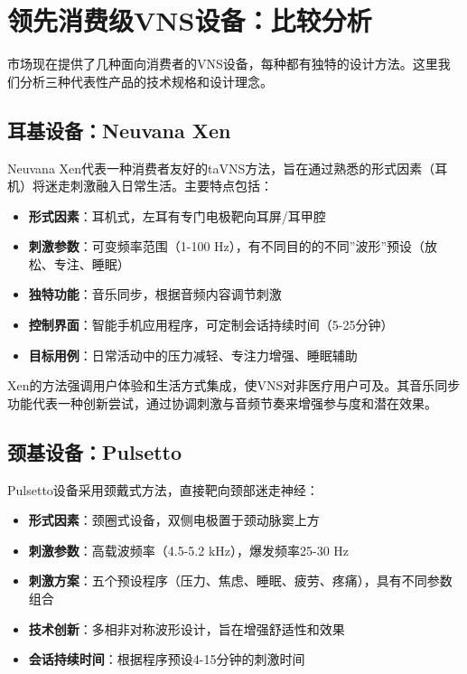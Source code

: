 \documentclass[
  Letterpaper,
]{scrbook}
\providecommand{\tightlist}{%
  \setlength{\itemsep}{0pt}\setlength{\parskip}{0pt}}\usepackage{longtable,booktabs,array}
\begin{document}
\section{领先消费级VNS设备：比较分析}\label{ux9886ux5148ux6d88ux8d39ux7ea7vnsux8bbeux5907ux6bd4ux8f83ux5206ux6790}

市场现在提供了几种面向消费者的VNS设备，每种都有独特的设计方法。这里我们分析三种代表性产品的技术规格和设计理念。

\subsection{耳基设备：Neuvana
Xen}\label{ux8033ux57faux8bbeux5907neuvana-xen}

Neuvana
Xen代表一种消费者友好的taVNS方法，旨在通过熟悉的形式因素（耳机）将迷走刺激融入日常生活。主要特点包括：

\begin{itemize}
\tightlist
\item
  \textbf{形式因素}：耳机式，左耳有专门电极靶向耳屏/耳甲腔
\item
  \textbf{刺激参数}：可变频率范围（1-100
  Hz），有不同目的的不同''波形''预设（放松、专注、睡眠）
\item
  \textbf{独特功能}：音乐同步，根据音频内容调节刺激
\item
  \textbf{控制界面}：智能手机应用程序，可定制会话持续时间（5-25分钟）
\item
  \textbf{目标用例}：日常活动中的压力减轻、专注力增强、睡眠辅助
\end{itemize}

Xen的方法强调用户体验和生活方式集成，使VNS对非医疗用户可及。其音乐同步功能代表一种创新尝试，通过协调刺激与音频节奏来增强参与度和潜在效果。

\subsection{颈基设备：Pulsetto}\label{ux9888ux57faux8bbeux5907pulsetto}

Pulsetto设备采用颈戴式方法，直接靶向颈部迷走神经：

\begin{itemize}
\tightlist
\item
  \textbf{形式因素}：颈圈式设备，双侧电极置于颈动脉窦上方
\item
  \textbf{刺激参数}：高载波频率（4.5-5.2 kHz），爆发频率25-30 Hz
\item
  \textbf{刺激方案}：五个预设程序（压力、焦虑、睡眠、疲劳、疼痛），具有不同参数组合
\item
  \textbf{技术创新}：多相非对称波形设计，旨在增强舒适性和效果
\item
  \textbf{会话持续时间}：根据程序预设4-15分钟的刺激时间
\end{itemize}
\end{document}
